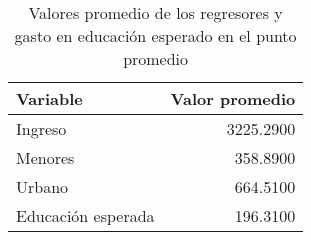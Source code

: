 \begin{table}
\caption{Valores promedio de los regresores y gasto en educación esperado en el punto promedio}
\label{tab:prediccion_media}
\begin{tabular}{lr}
\toprule
Variable & Valor promedio \\
\midrule
Ingreso & 3225.2900 \\
Menores & 358.8900 \\
Urbano & 664.5100 \\
Educación esperada & 196.3100 \\
\bottomrule
\end{tabular}
\end{table}
